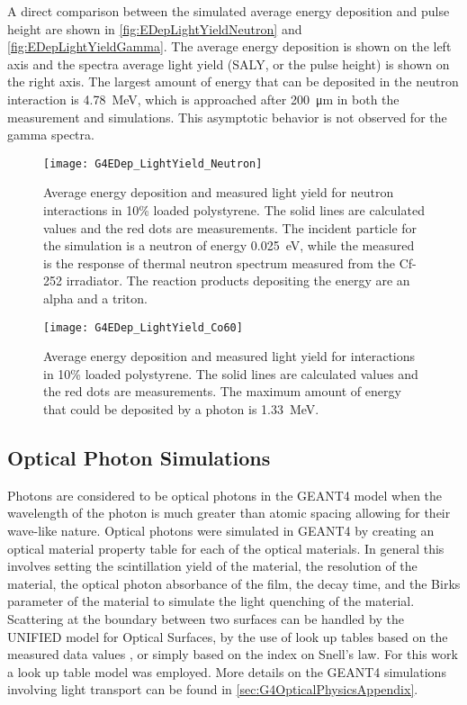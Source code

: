 A direct comparison between the simulated average energy deposition and pulse height are shown in \autoref{fig:EDepLightYieldNeutron} and \autoref{fig:EDepLightYieldGamma}. 
The average energy deposition is shown on the left axis and the spectra average light yield (SALY, or the pulse height) is shown on the right axis.
The largest amount of energy that can be deposited in the neutron interaction is \SI{4.78}{\MeV}, which is approached after \SI{200}{\um} in both the measurement and simulations.
This asymptotic behavior is not observed for the gamma spectra.
\begin{figure}
	\centering
    \texttt{[image: G4EDep\_LightYield\_Neutron]}
	  \caption[Average Light Yield and Energy Deposition for neutron interactions in PS]{Average energy deposition and measured light yield for neutron interactions in 10\% loaded polystyrene. The solid lines are calculated values and the red dots are measurements. The incident particle for the simulation is a neutron of energy \SI{0.025}{\eV}, while the measured is the response of thermal neutron spectrum measured from the Cf-252 irradiator. The reaction products depositing the energy are an alpha and a triton.}
	\label{fig:EDepLightYieldNeutron}
\end{figure}
\begin{figure}
	\centering
    	\texttt{[image: G4EDep\_LightYield\_Co60]}
	\caption[Average Light Yield and Energy Deposition for Gamma interactions in PS]{Average energy deposition and measured light yield for  interactions in 10\% loaded polystyrene. The solid lines are calculated values and the red dots are measurements. The maximum amount of energy that could be deposited by a  photon is \SI{1.33}{\MeV}.}
	\label{fig:EDepLightYieldGamma}
\end{figure}

\subsection{Optical Photon Simulations}
\label{sec:OpticalPhotonSims}
Photons are considered to be optical photons in the GEANT4 model when the wavelength of the photon is much greater than atomic spacing allowing for their wave-like nature.
Optical photons were simulated in GEANT4 by creating an optical material property table for each of the optical materials.
In general this involves setting the scintillation yield of the material, the resolution of the material, the optical photon absorbance of the film, the decay time, and the Birks parameter of the material to simulate the light quenching of the material.
Scattering at the boundary between two surfaces can be  handled by the UNIFIED model for Optical Surfaces, by the use of look up tables based on the measured data values \cite{5485130}, or simply based on the index on Snell's law.
For this work a look up table model was employed. More details on the GEANT4 simulations involving light transport can be found in \autoref{sec:G4OpticalPhysicsAppendix}.


